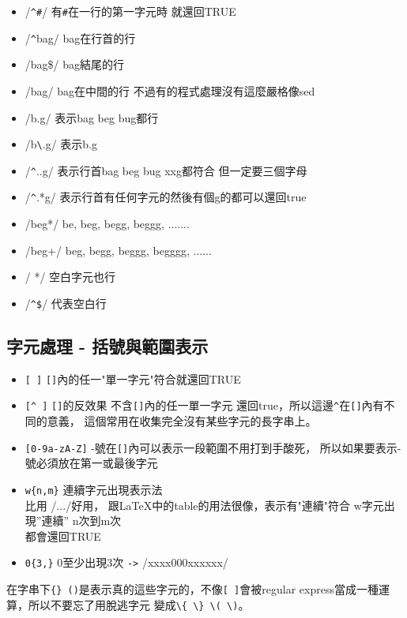     \begin{itemize}
        \item /\verb=^#=/      有\verb=#=在一行的第一字元時  就還回TRUE
	\item /\verb=^=bag/    bag在行首的行
	\item /bag\$/    bag結尾的行
	\item /bag/     bag在中間的行  不過有的程式處理沒有這麼嚴格像sed
	\item /b.g/     表示bag beg bug都行 
	\item /b\verb=\=.g/    表示b.g
	\item /\verb=^=..g/    表示行首bag beg bug xxg都符合 但一定要三個字母
	\item /\verb=^=.*g/    表示行首有任何字元的然後有個g的都可以還回true
	\item /beg*/    be, beg, begg, beggg, .......    
	\item /beg+/    beg, begg, beggg, begggg, ......
	\item / */      空白字元也行
	\item /\verb=^$=/    代表空白行 
    \end{itemize}
	\subsection{字元處理 - 括號與範圍表示}
	\begin{itemize}
	\item \verb=[ ]=       \verb=[]=內的任一"單一字元"符合就還回TRUE
	\item \verb=[^ ]=     \verb=[]=的反效果 不含\verb=[]=內的任一單一字元
			還回true，所以這邊\verb=^=在\verb=[]=內有不同的意義，
                        這個常用在收集完全沒有某些字元的長字串上。
	\item \verb=[0-9a-zA-Z]=    -號在\verb=[]=內可以表示一段範圍不用打到手酸死，
			所以如果要表示-號必須放在第一或最後字元
	\item \verb=w{n,m}=   連續字元出現表示法\\
		       比用 /.../好用，
                       跟{\LaTeX}中的table的用法很像，表示有"連續"符合
		       w字元出現''連續'' n次到m次 \\都會還回TRUE
	\item \verb=0{3,}=    0至少出現3次 \verb=->= /xxxx000xxxxxx/
	\end{itemize}
	在字串下\verb={} ()=是表示真的這些字元的，不像\verb=[ ]=會被regular
	express當成一種運算，所以不要忘了用脫逃字元 變成\verb=\{ \} \( \)=。
